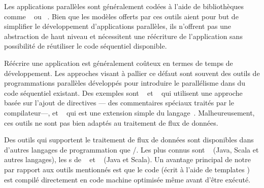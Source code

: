 \begin{introduction}
Les applications parall\`eles sont g\'en\'eralement cod\'ees \`a l'aide de biblioth\`eques comme ~\citep{AldinucciEtAl14} ou ~\citep{Reinders07}. Bien que les mod\`eles offerts par ces outils aient pour but de simplifier le d\'eveloppement d'applications parall\`eles, ils n'offrent pas une abstraction de haut niveau et n\'ecessitent une r\'e\'ecriture de l'application sans possibilit\'e de r\'eutiliser le code s\'equentiel disponible.


R\'e\'ecrire une application est g\'en\'eralement co\^uteux en termes de temps de d\'eveloppement. Les approches visant \`a pallier ce d\'efaut sont souvent des outils de programmations parall\`eles d\'evelopp\'es pour introduire le parall\'elisme dans du code s\'equentiel existant. Des exemples sont ~\citep{ChandraEtAl01} et ~\citep{farber2016parallel} qui utilisent une approche bas\'ee sur l'ajout de directives --- des commentaires sp\'eciaux trait\'es par le compilateur---, et ~\citep{leiserson1998programming} qui est une extension simple du langage~. Malheureusement, ces outils ne sont pas bien adapt\'es au traitement de flux de donn\'ees.


Des outils qui supportent le traitement de flux de donn\'ees sont disponibles dans d'autres langages de programmation que /. Les plus connus sont ~\citep{frampton2015mastering} (Java, Scala et autres langages), les s de ~\citep{warburton2014java} et ~\citep{flinkReferenceEnLigne} (Java et Scala). Un avantage principal de notre  par rapport aux outils mentionn\'es est que le code (\'ecrit \`a l'aide de templates ) est compil\'e directement en code machine optimis\'ee m\^eme avant d'\^etre ex\'ecut\'e. 



\end{introduction}

